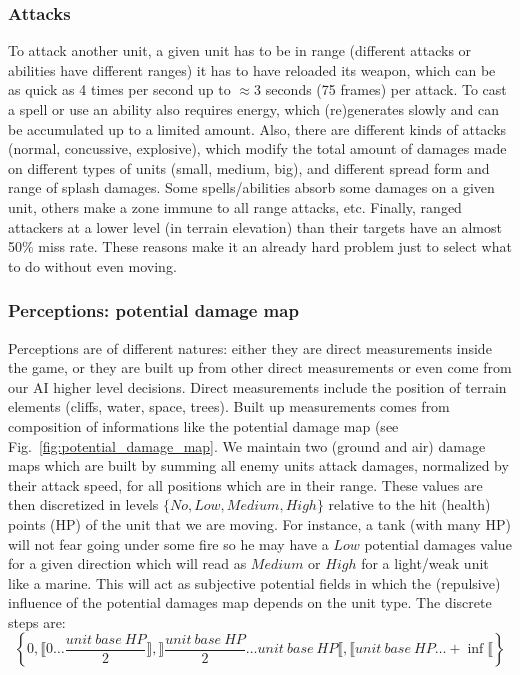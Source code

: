 \subsubsection{Attacks}
To attack another unit, a given unit has to be in range (different attacks or abilities have different ranges) it has to have reloaded its weapon, which can be as quick as 4 times per second up to $\approx$3 seconds (75 frames) per attack. To cast a spell or use an ability also requires energy, which (re)generates slowly and can be accumulated up to a limited amount. Also, there are different kinds of attacks (normal, concussive, explosive), which modify the total amount of damages made on different types of units (small, medium, big), and different spread form and range of splash damages. Some spells/abilities absorb some damages on a given unit, others make a zone immune to all range attacks, etc. Finally, ranged attackers at a lower level (in terrain elevation) than their targets have an almost 50\% miss rate. These reasons make it an already hard problem just to select what to do without even moving. 

\subsubsection{Perceptions: potential damage map}
Perceptions are of different natures: either they are direct measurements inside the game, or they are built up from other direct measurements or even come from our AI higher level decisions. Direct measurements include the position of terrain elements (cliffs, water, space, trees). Built up measurements comes from composition of informations like the potential damage map (see Fig.~\ref{fig:potential_damage_map}. We maintain two (ground and air) damage maps which are built by summing all enemy units attack damages, normalized by their attack speed, for all positions which are in their range. These values are then discretized in levels $\{No, Low, Medium, High\}$ relative to the hit (health) points (HP) of the unit that we are moving. For instance, a tank (with many HP) will not fear going under some fire so he may have a $Low$ potential damages value for a given direction which will read as $Medium$ or $High$ for a light/weak unit like a marine. This will act as subjective potential fields \citep{Hagelback2009} in which the (repulsive) influence of the potential damages map depends on the unit type. The discrete steps are: 
$$\left\{0, \llbracket 0\dots \frac{unit\ base\ HP}{2}\rrbracket, \rrbracket \frac{unit\ base\ HP}{2} \dots unit\ base\ HP\llbracket, \llbracket unit\ base\ HP \dots +\inf\llbracket\right\}$$

